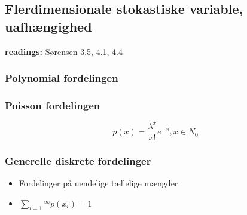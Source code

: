 \subsection{Flerdimensionale stokastiske variable, uafhængighed}

\textbf{readings:} 	Sørensen 3.5, 4.1, 4.4

\horizline

\subsubsection{Polynomial fordelingen}

\subsubsection{Poisson fordelingen}

\begin{equation}
    p(x) = \frac{\lambda^x}{x!}e^{-x}, x\in N_{0}
\end{equation}

\subsubsection{Generelle diskrete fordelinger}

\begin{itemize}
    \item Fordelinger på uendelige tællelige mængder 
    \item $\sum_{i=1}{^\infty} p(x_i) = 1$ 
\end{itemize}